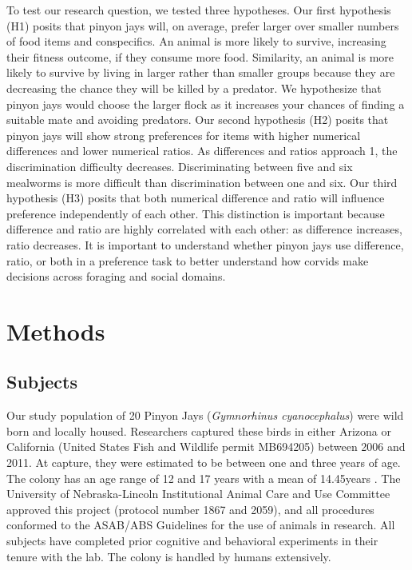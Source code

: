 \documentclass[
  english,
  ,doc,floatsintext]{apa6}
\begin{document}
To test our research question, we tested three hypotheses. Our first hypothesis (H1) posits that pinyon jays will, on average, prefer larger over smaller numbers of food items and conspecifics. An animal is more likely to survive, increasing their fitness outcome, if they consume more food. Similarity, an animal is more likely to survive by living in larger rather than smaller groups because they are decreasing the chance they will be killed by a predator. We hypothesize that pinyon jays would choose the larger flock as it increases your chances of finding a suitable mate and avoiding predators. Our second hypothesis (H2) posits that pinyon jays will show strong preferences for items with higher numerical differences and lower numerical ratios. As differences and ratios approach 1, the discrimination difficulty decreases. Discriminating between five and six mealworms is more difficult than discrimination between one and six. Our third hypothesis (H3) posits that both numerical difference and ratio will influence preference independently of each other. This distinction is important because difference and ratio are highly correlated with each other: as difference increases, ratio decreases. It is important to understand whether pinyon jays use difference, ratio, or both in a preference task to better understand how corvids make decisions across foraging and social domains.

\hypertarget{methods}{%
\section{Methods}\label{methods}}

\hypertarget{subjects}{%
\subsection{Subjects}\label{subjects}}

Our study population of 20 Pinyon Jays (\emph{Gymnorhinus cyanocephalus}) were wild born and locally housed. Researchers captured these birds in either Arizona or California (United States Fish and Wildlife permit MB694205) between 2006 and 2011. At capture, they were estimated to be between one and three years of age. The colony has an age range of 12 and 17 years with a mean of 14.45years . The University of Nebraska-Lincoln Institutional Animal Care and Use Committee approved this project (protocol number 1867 and 2059), and all procedures conformed to the ASAB/ABS Guidelines for the use of animals in research. All subjects have completed prior cognitive and behavioral experiments in their tenure with the lab. The colony is handled by humans extensively.
\end{document}
